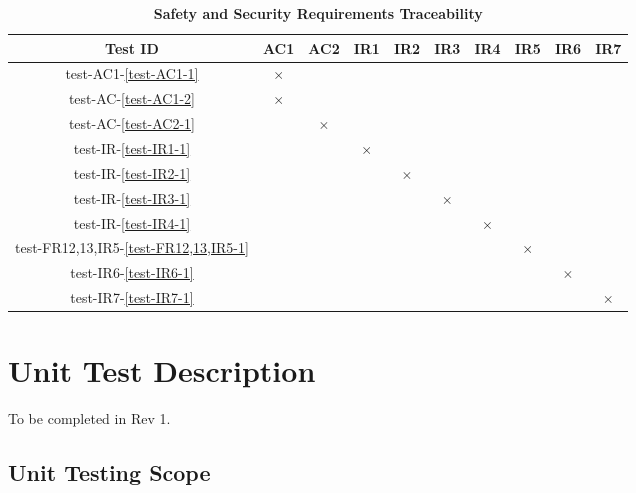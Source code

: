 \documentclass[12pt, titlepage]{article}
\begin{document}
\begin{landscape}
\begin{table} [H]
  \centering
  \begin{tabular}{|c|c|c|c|c|c|c|c|c|c|}
  \hline
  Test ID & AC1 & AC2 & IR1 & IR2 & IR3 & IR4 & IR5 & IR6 & IR7 \\
  \hline
  test-AC1-\ref{test-AC1-1} & $\times$ & & & & & & & & \\
  \hline
  test-AC-\ref{test-AC1-2} & $\times$ & & & & & & & & \\
  \hline
  test-AC-\ref{test-AC2-1} & & $\times$ & & & & & & & \\
  \hline
  test-IR-\ref{test-IR1-1} & & & $\times$ & & & & & &  \\
  \hline
  test-IR-\ref{test-IR2-1}  & & & & $\times$ & & & & & \\
  \hline
  test-IR-\ref{test-IR3-1}  & & & & & $\times$ & & & & \\
  \hline
  test-IR-\ref{test-IR4-1}  & & & & & & $\times$ & & & \\
  \hline
  test-FR12,13,IR5-\ref{test-FR12,13,IR5-1} & & & & & & & $\times$ & & \\
  \hline
  test-IR6-\ref{test-IR6-1}  & & & & & & & & $\times$ & \\
  \hline
  test-IR7-\ref{test-IR7-1}  & & & & & & & & & $\times$ \\
  \hline
\end{tabular}
\caption{\bf Safety and Security Requirements Traceability} \label{tab:sns-test-traceability}
\end{table}

\end{landscape}
\newpage


\section {Unit Test Description}

To be completed in Rev 1.

\subsection{Unit Testing Scope}

\end{document}
